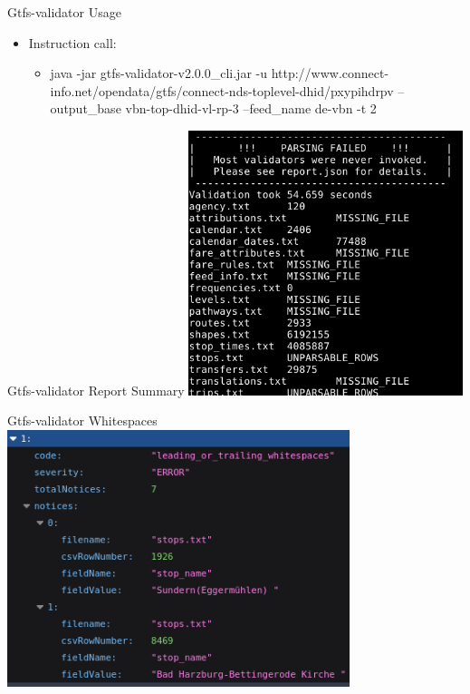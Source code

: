 
\begin{frame}{Gtfs-validator Usage}
  \begin{itemize}
  \item Instruction call:
    \begin{itemize}
      \item java -jar gtfs-validator-v2.0.0\_cli.jar -u http://www.connect-info.net/opendata/gtfs/connect-nds-toplevel-dhid/pxypihdrpv --output\_base vbn-top-dhid-vl-rp-3 --feed\_name de-vbn -t 2
    \end{itemize}
  \end{itemize}
\end{frame}

\begin{frame}{Gtfs-validator Report Summary}
\includegraphics[width=0.6\textwidth]{gtfs-validation/gtfs-validator-report-summary.png}
\end{frame}

\begin{frame}{Gtfs-validator Whitespaces}
\includegraphics[width=0.75\textwidth]{gtfs-validation/gtfs-validator-report-whitespaces.png}
\end{frame}

